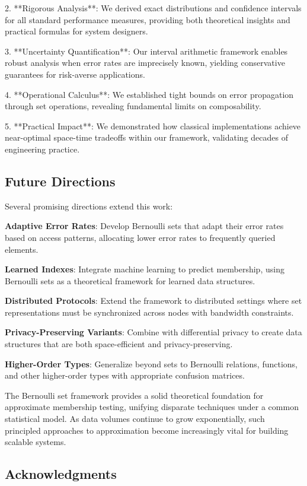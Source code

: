 \documentclass[11pt]{article}
\begin{document}
2. **Rigorous Analysis**: We derived exact distributions and confidence intervals for all standard performance measures, providing both theoretical insights and practical formulas for system designers.

3. **Uncertainty Quantification**: Our interval arithmetic framework enables robust analysis when error rates are imprecisely known, yielding conservative guarantees for risk-averse applications.

4. **Operational Calculus**: We established tight bounds on error propagation through set operations, revealing fundamental limits on composability.

5. **Practical Impact**: We demonstrated how classical implementations achieve near-optimal space-time tradeoffs within our framework, validating decades of engineering practice.

\subsection{Future Directions}

Several promising directions extend this work:

\textbf{Adaptive Error Rates}: Develop Bernoulli sets that adapt their error rates based on access patterns, allocating lower error rates to frequently queried elements.

\textbf{Learned Indexes}: Integrate machine learning to predict membership, using Bernoulli sets as a theoretical framework for learned data structures.

\textbf{Distributed Protocols}: Extend the framework to distributed settings where set representations must be synchronized across nodes with bandwidth constraints.

\textbf{Privacy-Preserving Variants}: Combine with differential privacy to create data structures that are both space-efficient and privacy-preserving.

\textbf{Higher-Order Types}: Generalize beyond sets to Bernoulli relations, functions, and other higher-order types with appropriate confusion matrices.

The Bernoulli set framework provides a solid theoretical foundation for approximate membership testing, unifying disparate techniques under a common statistical model. As data volumes continue to grow exponentially, such principled approaches to approximation become increasingly vital for building scalable systems.

\subsection{Acknowledgments}
\end{document}

